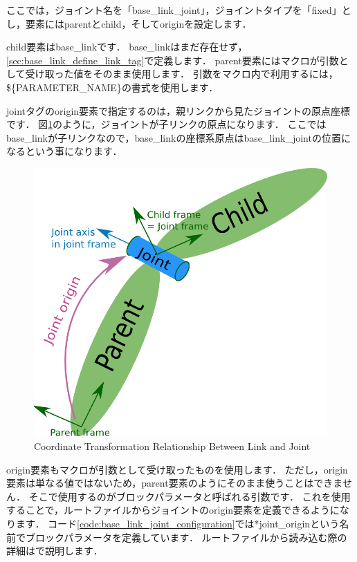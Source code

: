 \documentclass[{../../master}]{subfiles}
\begin{document}
ここでは，ジョイント名を「\textsf{base\_link\_joint}」，ジョイントタイプを「\textsf{fixed}」とし，要素には\textsf{parent}と\textsf{child}，そして\textsf{origin}を設定します．

\textsf{child}要素は\textsf{base\_link}です．
\textsf{base\_link}はまだ存在せず，\ref{sec:base_link_define_link_tag}で定義します．
\textsf{parent}要素にはマクロが引数として受け取った値をそのまま使用します．
引数をマクロ内で利用するには，\textsf{\$\{\<PARAMETER\_NAME\>\}}の書式を使用します．

\textsf{joint}タグの\textsf{origin}要素で指定するのは，親リンクから見たジョイントの原点座標です．
図\ref{fig:joint}のように，ジョイントが子リンクの原点になります．
ここでは\textsf{base\_link}が子リンクなので，\textsf{base\_link}の座標系原点は\textsf{base\_link\_joint}の位置になるという事になります．

\begin{figure}[ht]
  \centering
  \includegraphics[width=100truemm, clip]{images/joint.png}
  \caption{Coordinate Transformation Relationship Between Link and Joint\cite{urdf_xml_joint}}
  \label{fig:joint}
\end{figure}

\textsf{origin}要素もマクロが引数として受け取ったものを使用します．
ただし，\textsf{origin}要素は単なる値ではないため，\textsf{parent}要素のようにそのまま使うことはできません．
そこで使用するのがブロックパラメータと呼ばれる引数です．
これを使用することで，ルートファイルからジョイントの\textsf{origin}要素を定義できるようになります．
コード\ref{code:base_link_joint_configuration}では\textsf{*joint\_origin}という名前でブロックパラメータを定義しています．
ルートファイルから読み込む際の詳細は\label{sec:base_link_include}で説明します．
\end{document}
